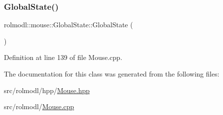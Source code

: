 \subsubsection{\texorpdfstring{GlobalState()}{GlobalState()}}
{\footnotesize\ttfamily rolmodl\+::mouse\+::\+Global\+State\+::\+Global\+State (\begin{DoxyParamCaption}{ }\end{DoxyParamCaption})\hspace{0.3cm}{\ttfamily [noexcept]}}



Definition at line 139 of file Mouse.\+cpp.



The documentation for this class was generated from the following files\+:\begin{DoxyCompactItemize}
\item 
src/rolmodl/hpp/\mbox{\hyperlink{_mouse_8hpp}{Mouse.\+hpp}}\item 
src/rolmodl/\mbox{\hyperlink{_mouse_8cpp}{Mouse.\+cpp}}\end{DoxyCompactItemize}
